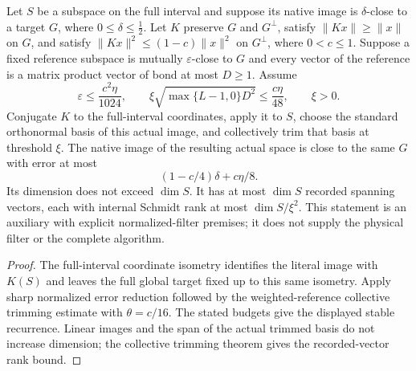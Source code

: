 \begin{lemma}
    \label{lem:alvv-native-root-filter-trim}
    \leanok
    Let $S$ be a subspace on the full interval and suppose its native image is
    $\delta$-close to a target $G$, where $0\leq\delta\leq\tfrac12$.
    Let $K$ preserve $G$ and $G^\perp$, satisfy $\|Kx\|\geq\|x\|$ on $G$, and
    satisfy $\|Kx\|^2\leq(1-c)\|x\|^2$ on $G^\perp$, where $0<c\leq1$.
    Suppose a fixed reference subspace is mutually $\varepsilon$-close to $G$
    and every vector of the reference is a matrix product vector of bond at most
    $D\geq1$. Assume
    \[
        \varepsilon\leq\frac{c^2\eta}{1024},\qquad
        \xi\sqrt{\max\{L-1,0\}D^2}\leq\frac{c\eta}{48},\qquad \xi>0.
    \]
    Conjugate $K$ to the full-interval coordinates, apply it to $S$, choose the
    standard orthonormal basis of this actual image, and collectively trim that
    basis at threshold $\xi$. The native image of the resulting actual space
    is close to the same $G$ with error at most
    \[
        (1-c/4)\delta+c\eta/8.
    \]
    Its dimension does not exceed $\dim S$. It has at most $\dim S$ recorded
    spanning vectors, each with internal Schmidt rank at most $\dim S/\xi^2$.
    This statement is an auxiliary with explicit normalized-filter premises;
    it does not supply the physical filter or the complete algorithm.
\end{lemma}
\begin{proof}\leanok
    The full-interval coordinate isometry identifies the literal image with
    $K(S)$ and leaves the full global target fixed up to this same isometry.
    Apply sharp normalized error reduction followed by the weighted-reference
    collective trimming estimate with $\theta=c/16$. The stated budgets give
    the displayed stable recurrence. Linear images and the span of the actual
    trimmed basis do not increase dimension; the collective trimming theorem
    gives the recorded-vector rank bound.
\end{proof}


